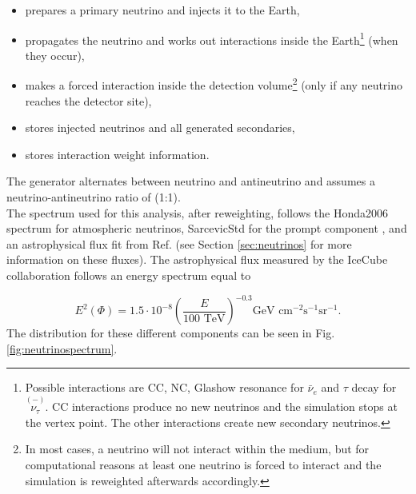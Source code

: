 \newcommand\barparen[1]{\overset{(-)}{#1}}
\vspace{2mm}
\begin{itemize}
\item prepares a primary neutrino and injects it to the Earth,
\item propagates the neutrino and works out interactions inside the Earth\footnote{Possible interactions are CC, NC, Glashow resonance for $\bar{\nu}_e$ and $\tau$ decay for $\barparen{\nu_\tau}$. CC interactions produce no new neutrinos and the simulation stops at the vertex point. The other interactions create new secondary neutrinos.} (when they occur),
\item makes a forced interaction inside the detection volume\footnote{
In most cases, a neutrino will not interact within the medium, but for computational reasons at least one neutrino is forced to interact and the simulation is reweighted afterwards accordingly.} (only if any neutrino reaches the detector site),
\item stores injected neutrinos and all generated secondaries,
\item stores interaction weight information.
\end{itemize}
\vspace{3mm}
\noindent The generator alternates between neutrino and antineutrino and assumes a neutrino-antineutrino ratio of (1:1).\\

\noindent The spectrum used for this analysis, after reweighting, follows the Honda2006 spectrum \cite{Honda:2006qj} for atmospheric neutrinos, SarcevicStd for the prompt component \cite{Enberg:2008te}, and an astrophysical flux fit from Ref. \cite{Aartsen:2014gkd} (see Section \ref{sec:neutrinos} for more information on these fluxes). The astrophysical flux measured by the IceCube collaboration follows an energy spectrum equal to

\begin{equation}
E^2 \left(\Phi \right) = 1.5 \cdot 10^{-8} \left( \frac{E}{100 \textrm{ TeV}} \right)^{-0.3} \textrm{GeV } \textrm{cm}^{-2} \textrm{s}^{-1} \textrm{sr}^{-1}.
\end{equation}
\vspace{3mm}
\noindent The distribution for these different components can be seen in Fig. \ref{fig:neutrinospectrum}.

